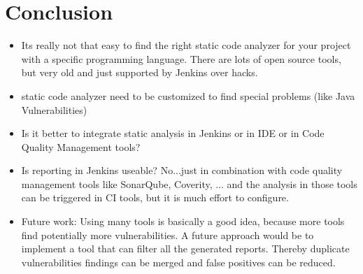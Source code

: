 \documentclass[conference]{IEEEtran}
\begin{document}

\section{Conclusion}
\label{sec:conclusion}
\begin{itemize}
	\item Its really not that easy to find the right static code analyzer for your project with a specific programming language. There are lots of open source tools, but very old and just supported by Jenkins over hacks.
	\item static code analyzer need to be customized to find special problems (like Java Vulnerabilities)
	\item Is it better to integrate static analysis in Jenkins or in IDE or in Code Quality Management tools?
	\item Is reporting in Jenkins useable? No...just in combination with code quality management tools like SonarQube, Coverity, ... and the analysis in those tools can be triggered in CI tools, but it is much effort to configure.
	\item Future work: Using many tools is basically a good idea, because more tools find potentially more vulnerabilities. A future approach would be to implement a tool that can filter all the generated reports. Thereby duplicate vulnerabilities findings can be merged and false positives can be reduced.
\end{itemize}





\end{document}
